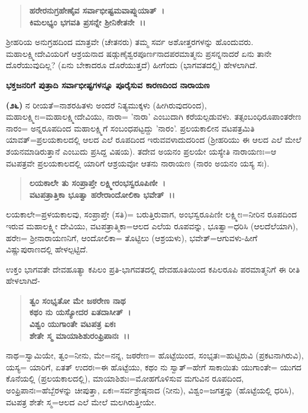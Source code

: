 \begin{verse}
\textbf{ಹರೇರನುಗ್ರಹೇಣೈವ ಸರ್ವಾಭೀಷ್ಟಮವಾಪ್ನುಯಾತ್~।}\\\textbf{ಕಿಮಲಭ್ಯಂ ಭಗವತಿ ಪ್ರಸನ್ನೇ ಶ‍್ರೀನಿಕೇತನೇ~।।}
\end{verse}

ಶ‍್ರೀಹರಿಯ ಅನುಗ್ರಹದಿಂದ ಮಾತ್ರವೇ (ಚೇತನರು) ತಮ್ಮ ಸರ್ವ ಅಶೋತ್ತರಗಳನ್ನು ಹೊಂದುವರು. ಮಹಾಲಕ್ಷ್ಮೀದೇವಿಯರಿಗೆ ಆಶ್ರಯನಾದ ಷಡ್ಗುಣೈಶ್ವರಪೂರ್ಣನಾದ\break ಪರಮಾತ್ಮನು ಪ್ರಸನ್ನನಾದರೆ ಏನು ತಾನೇ ದೊರೆಯುವುದಿಲ್ಲ? (ಏನು ಬೇಕಾದರೂ ದೊರೆಯುತ್ತದೆ) ಹೀಗೆಂದು (ಭಾಗವತದಲ್ಲಿ) ಹೇಳಲಾಗಿದೆ.

\begin{center}
\textbf{ಭಕ್ತಜನರಿಗೆ ಪುತ್ರಾದಿ ಸರ್ವಾಭೀಷ್ಟಗಳನ್ನೂ ಪೂರೈಸುವ ಕಾರಣದಿಂದ ನಾರಾಯಣ}
\end{center}

\textbf{(೨೬)} ನ ರೀಯತೆ=ನಾಶರಹಿತಳು ಅಂದರೆ ನಿತ್ಯಮುಕ್ಕಳು (ಹೀಗಿರುವುದರಿಂದ), ಮಹಾಲಕ್ಷ್ಮೀಃ=ಮಹಾಲಕ್ಷ್ಮೀದೇವಿಯು, ನಾರಾ= 'ನಾರಾ' ಎಂಬುದಾಗಿ ಕರೆಯಲ್ಪಡುವಳು. ತತ್ಸಂಬಂಧಿರೂಪಾಂತರೇಣ ನಾರಂ= ಅನ್ನರೂಪದಿಂದ ಮಹಾಲಕ್ಷ್ಮಿಗೆ ಸಂಬಂಧಪಟ್ಟದ್ದು 'ನಾರಂ'. ಪ್ರಲಯಕಾಲೀನ ವಟಪತ್ರಮಿತಿ ಯಾವತ್=ಪ್ರಲಯಕಾಲದಲ್ಲಿ ಆಲದ ಎಲೆ ರೂಪದಿಂದ ಇರುವವಳಾದುದರಿಂದ (ಶ‍್ರೀಹರಿಯು ಈ ಆಲದ ಎಲೆ ಮೇಲೆ ಶಯನಮಾಡಿರುತ್ತಾನೆ ಎಂಬುದು ಪ್ರಸಿದ್ದ ವಿಷಯ). ತದೇವ ಅಯನಂ ಪ್ರಲಯೇ ಯಸ್ಯೇತಿ ನಾರಾಯಣಃ=ಆ ವಟಪತ್ರವೇ ಪ್ರಲಯಕಾಲದಲ್ಲಿ ಯಾರಿಗೆ ಆಶ್ರಯವೋ ಆತನು ನಾರಾಯಣ (ನಾರಂ ಅಯನಂ ಯಸ್ಯ ಸಃ).

\begin{verse}
\textbf{ಲಯಕಾಲೇ ತು ಸಂಪ್ರಾಪ್ತೇ ಲಕ್ಷ್ಮೀರಂಭಸ್ವರೂಪಿಣೀ~।}\\\textbf{ವಟಪತ್ರಾತ್ತಿಕಾ ಭೂತ್ವಾ ಹರೇರಾಂದೋಲಿಕಾ ಭವೇತ್~।।}
\end{verse}


ಲಯಕಾಲೇ=ಪ್ರಳಯಕಾಲವು, ಸಂಪ್ರಾಪ್ತೇ (ಸತಿ)= ಬರುತ್ತಿರುವಾಗ, ಅಂಭಸ್ವರೂಪಿಣೀ ಲಕ್ಷ್ಮೀಃ=ನೀರಿನ ರೂಪದಿಂದ ಇರುವ ಮಹಾಲಕ್ಷ್ಮೀ ದೇವಿಯು, ವಟಪತ್ರಾತ್ಮಿಕಾ=ಆಲದ ಎಲೆಯ ರೂಪವನ್ನು, ಭೂತ್ವಾ=ಧರಿಸಿ (ಆಲದೆಲೆಯಾಗಿ), ಹರೇಃ= ಶ‍್ರೀನಾರಾಯಣನಿಗೆ, ಆಂದೋಲಿಕಾ= ತೊಟ್ಟಿಲು (ಆಶ್ರಯಳು), ಭವೇತ್=ಆಗುವಳು-ಹೀಗೆ ವಿಷ್ಣುಪುರಾಣದಲ್ಲಿ ಹೇಳಲ್ಪಟ್ಟಿದೆ.

ಉಕ್ತಂ ಭಾಗವತೇ ದೇವಹೂತ್ಯಾ ಕಪಿಲಂ ಪ್ರತಿ-ಭಾಗವತದಲ್ಲಿ ದೇವಹೂತಿಯಿಂದ ಕಪಿಲರೂಪಿ ಪರಮಾತ್ಮನಿಗೆ ಈ ರೀತಿ ಹೇಳಲಾಗಿದೆ-

\begin{verse}
\textbf{ತ್ವಂ ಸಂಭೃತೋ ಮೇ ಜಠರೇಣ ನಾಥ}\\\textbf{ಕಥಂ ನು ಯಸ್ಯೋದರ ಏತದಾಸೀತ್~।}\\\textbf{ವಿಶ್ವಂ ಯುಗಾಂತೇ ವಟಪತ್ರ ಏಕಃ}\\\textbf{ಶೇತೇ ಸ್ಮ ಮಾಯಾಶಿಶುರಂಫ್ರಿಪಾನಃ~।।}
\end{verse}

ನಾಥ=ಸ್ವಾಮಿಯೇ, ತ್ವಂ=ನೀನು, ಮೇ=ನನ್ನ, ಜಠರೇಣ= ಹೊಟ್ಟೆಯಿಂದ, ಸಂಭೃತಃ\-=ಹುಟ್ಟಿರುವಿ (ಪ್ರಕಟನಾಗಿರುವಿ), ಯಸ್ಯ= ಯಾರಿಗೆ, ಏತತ್ ಉದರಃ=ಈ ಹೊಟ್ಟೆಯು, ಕಥಂ ನು ಸ್ವಾತ್=ಹೇಗೆ ಸಾಕಾಯಿತು ಯುಗಾಂತೇ= ಯುಗದ ಕೊನೆಯಲ್ಲಿ (ಪ್ರಲಯಕಾಲದಲ್ಲಿ), ಮಾಯಾಶಿಶುಃ=ಮೋಹಗೊಳಿಸುವ ಮಗುವಿನ ರೂಪದಿಂದ, ಅಂಫ್ರಿಪಾನಃ=ಹೆಬ್ಬೆರ\-ಳನ್ನು ಚೀಪುತ್ತಾ, ಏಕಃ=ಸರ್ವಶ್ರೇಷ್ಠನಾದ (ನೀನು), ವಿಶ್ವಂ=ಜಗತ್ತನ್ನು (ಹೊಟ್ಟೆಯಲ್ಲಿ ಧರಿಸಿ), ವಟಪತ್ರ ಶೇತೇ ಸ್ಮ=ಆಲದ ಎಲೆ ಮೇಲೆ ಮಲಗಿರುತ್ತೀಯೇ.

